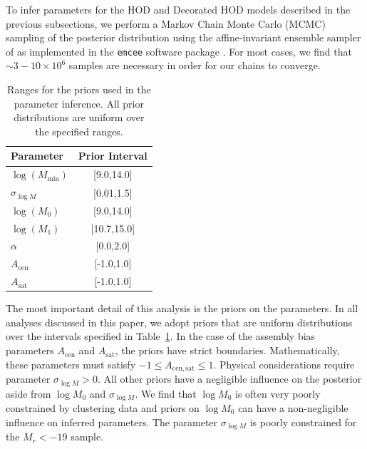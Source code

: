 \documentclass[usenatbib,usegraphicx,letterpaper]{mn2e}
\newcommand{\magr}{M_r}
\begin{document}
To infer parameters for the HOD and Decorated HOD models described in the previous subsections,
we perform a Markov Chain Monte Carlo (MCMC) sampling of the posterior distribution using the
affine-invariant ensemble sampler of \citet{goodman_weare10} as implemented in the
{\tt emcee} software package \citep{foreman-mackey_etal13}. For most cases, we find that
$\sim 3-10 \times 10^{6}$ samples are necessary in order for our chains to converge.


\begin{table}
\begin{center}
{\renewcommand{\arraystretch}{1.3}
\renewcommand{\tabcolsep}{0.2cm}
\begin{tabular}{l c}
\hline
\hline
Parameter & Prior Interval\\
\hline
$\log (M_{\mathrm{min}})$ & [9.0,14.0] \\
$\sigma_{\log M}$ & [0.01,1.5] \\
$\log (M_0)$ & [9.0,14.0]\\
$\log (M_1)$ & [10.7,15.0]\\
$\alpha$ & [0.0,2.0]\\
$A_{\mathrm{cen}}$ & [-1.0,1.0]\\
$A_{\mathrm{sat}}$ & [-1.0,1.0]\\
\hline
\end{tabular}
\medskip
\caption{
Ranges for the priors used in the parameter inference. All prior distributions are uniform over the
specified ranges.}
 }
 \label{table:priors}
 \end{center}
\end{table}


The most important detail of this analysis is the priors on the parameters. In all analyses
discussed in this paper, we adopt priors that are uniform distributions over the intervals
specified in Table~\ref{table:priors}. In the case of the assembly bias parameters
$A_{\mathrm{cen}}$ and $A_{\mathrm{sat}}$, the priors have strict
boundaries. Mathematically, these parameters must satisfy $-1 \le A_{\mathrm{cen,sat}} \le 1$.
Physical considerations require parameter $\sigma_{\log M} > 0$. All other
priors have a negligible influence on the posterior aside from $\log M_0$ and 
$\sigma_{\log M}$. We find that $\log M_0$ is often very poorly constrained by clustering data and
priors on $\log M_0$ can have a non-negligible influence on inferred parameters. The parameter 
$\sigma_{\log M}$ is poorly constrained for the $\magr < -19$ sample.
\end{document}
